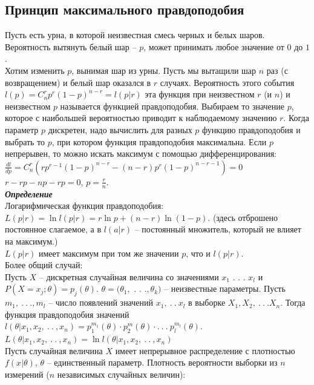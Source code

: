\documentclass[russian, 12pt, fleqn]{article}
\begin{document}
\subsection{Принцип максимального правдоподобия}
\noindent
Пусть есть урна, в которой неизвестная смесь черных и белых шаров.\\ Вероятность вытянуть белый шар -- $p$, может принимать любое значение от $0$ до $1$ .\\ 
Хотим изменить $p$, вынимая шар из урны. Пусть мы вытащили шар $n$ раз (с возвращением) и белый шар оказался в $r$ случаях. Вероятность этого события $l(p) = C^r_n p^r (1-p)^{n - r} = l(p|r)$ эта функция при неизвестном $r$ (и $n$) и неизвестном $p$ называется функцией правдоподобия. Выбираем то значение $p$, которое с наибольшей  вероятностью приводит к наблюдаемому значению $r$. Когда параметр $p$ дискретен, надо вычислить для разных $p$ функцию правдоподобия  и выбрать то $p$, при котором функция правдоподобия максимальна.  Если $p$ непрерывен, то можно искать максимум с помощью дифференцирования: $\frac{dl}{dp} = C^r_n (rp^{r - 1}(1-p)^{n - r} - (n - r) p ^ r  (1-p) ^{n - r - 1}) = 0$\\
$r - rp - np - rp = 0$, $p = \frac{r}{n}$.\\
\textit{\textbf{Определение}}\\
Логарифмическая функция правдоподобия: \\$L(p|r) = \ln l(p|r) = r \ln p + (n-r) \ln (1-p)$. (здесь отброшено постоянное слагаемое, а в $l(a|r)$ -- постоянный множитель, который не влияет на максимум.)\\
$L(p|r)$ имеет максимум при том же значении $p$, что и $l(p|r)$.\\
Более общий случай:\\
Пусть $X$ -- дискретная случайная величина со значениями $x_1$ . . . $x_l$ и\\ $P(X=x_j; \theta) = p_j(\theta)$. $\theta = (\theta_1, $ . . .$,\theta_k)$ -- неизвестные параметры. Пусть $m_1, \ .\ .\ .,m_l$ -- число появлений значений $x_1, \ .\ .\ x_l$ в выборке $X_1, X_2, \ .\ .\ . X_n$. Тогда функция правдоподобия  значений $l(\theta | x_1, x_2, \ .\ .\ , x_n) = p_1^{m_1}(\theta) \cdot p_2^m(\theta) \cdot . \ .\ .\ p_l^{m_l}(\theta)$. $ L(\theta | x_1, x_2, \ .\ .\ , x_n) =\ln l (\theta | x_1, x_2, \ .\ .\ , x_n) $\\
Пусть случайная величина $X$ имеет непрерывное распределение с плотностью $f(x|\theta)$, $\theta$ -- единственный параметр. Плотность вероятности выборки из $n$ измерений ($n$ независимых случайных величин):\\
\end{document}
